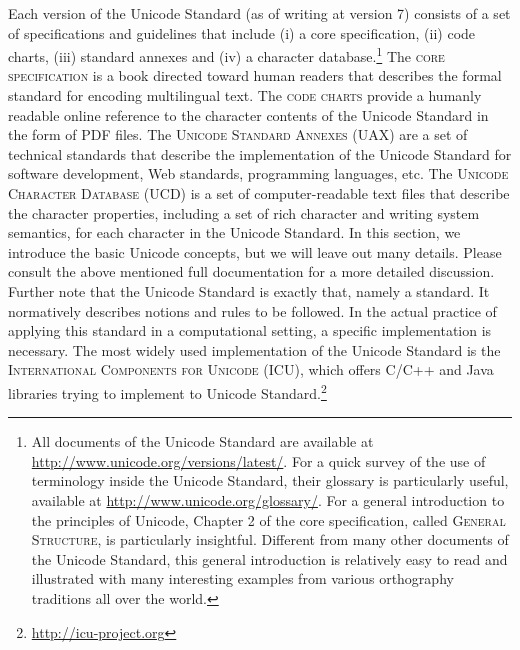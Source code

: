 Each version of the Unicode Standard (as of writing at version 7) consists of a
set of specifications and guidelines that include (i) a core specification, (ii)
code charts, (iii) standard annexes and (iv) a character database.\footnote{All
documents of the Unicode Standard are available at
\url{http://www.unicode.org/versions/latest/}. For a quick survey of the use of
terminology inside the Unicode Standard, their glossary is particularly useful,
available at \url{http://www.unicode.org/glossary/}. For a general introduction
to the principles of Unicode, Chapter 2 of the core specification, called
\textsc{General Structure}, is particularly insightful. Different from many
other documents of the Unicode Standard, this general introduction is relatively
easy to read and illustrated with many interesting examples from various
orthography traditions all over the world.} The \textsc{core specification} is a
book directed toward human readers that describes the formal standard for
encoding multilingual text. The \textsc{code charts} provide a humanly readable
online reference to the character contents of the Unicode Standard in the form
of PDF files. The \textsc{Unicode Standard Annexes (UAX)} are a set of technical
standards that describe the implementation of the Unicode Standard for software
development, Web standards, programming languages, etc. The \textsc{Unicode
Character Database (UCD)} is a set of computer-readable text files that describe
the character properties, including a set of rich character and writing system
semantics, for each character in the Unicode Standard. In this section, we
introduce the basic Unicode concepts, but we will leave out many details. Please
consult the above mentioned full documentation for a more detailed discussion.
Further note that the Unicode Standard is exactly that, namely a standard. It
normatively describes notions and rules to be followed. In the actual practice
of applying this standard in a computational setting, a specific implementation
is necessary. The most widely used implementation of the Unicode Standard is the
\textsc{International Components for Unicode (ICU)}, which offers C/C++ and Java
libraries trying to implement to Unicode
Standard.\footnote{\url{http://icu-project.org}}

